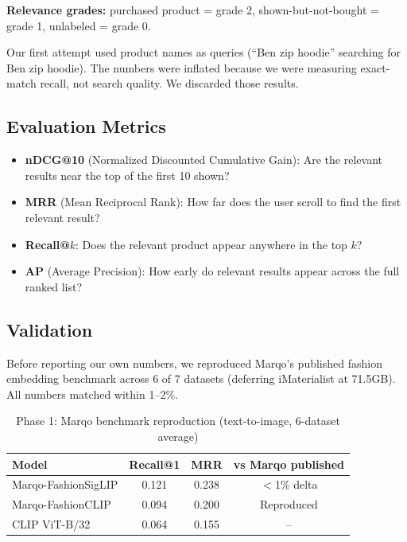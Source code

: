 \documentclass[11pt,a4paper]{article}
\begin{document}
\textbf{Relevance grades:} purchased product = grade 2, shown-but-not-bought = grade 1, unlabeled = grade 0.

Our first attempt used product names as queries (``Ben zip hoodie'' searching for Ben zip hoodie). The numbers were inflated because we were measuring exact-match recall, not search quality. We discarded those results.

\subsection{Evaluation Metrics}

\begin{itemize}[nosep]
    \item \textbf{nDCG@10} (Normalized Discounted Cumulative Gain): Are the relevant results near the top of the first 10 shown?
    \item \textbf{MRR} (Mean Reciprocal Rank): How far does the user scroll to find the first relevant result?
    \item \textbf{Recall@$k$}: Does the relevant product appear anywhere in the top $k$?
    \item \textbf{AP} (Average Precision): How early do relevant results appear across the full ranked list?
\end{itemize}

\subsection{Validation}

Before reporting our own numbers, we reproduced Marqo's published fashion embedding benchmark across 6 of 7 datasets (deferring iMaterialist at 71.5GB). All numbers matched within 1--2\%.

\begin{table}[h]
\centering
\caption{Phase 1: Marqo benchmark reproduction (text-to-image, 6-dataset average)}
\begin{tabular}{lccc}
\toprule
\textbf{Model} & \textbf{Recall@1} & \textbf{MRR} & \textbf{vs Marqo published} \\
\midrule
Marqo-FashionSigLIP & 0.121 & 0.238 & $<$1\% delta \\
Marqo-FashionCLIP & 0.094 & 0.200 & Reproduced \\
CLIP ViT-B/32 & 0.064 & 0.155 & -- \\
\bottomrule
\end{tabular}
\end{table}
\end{document}
